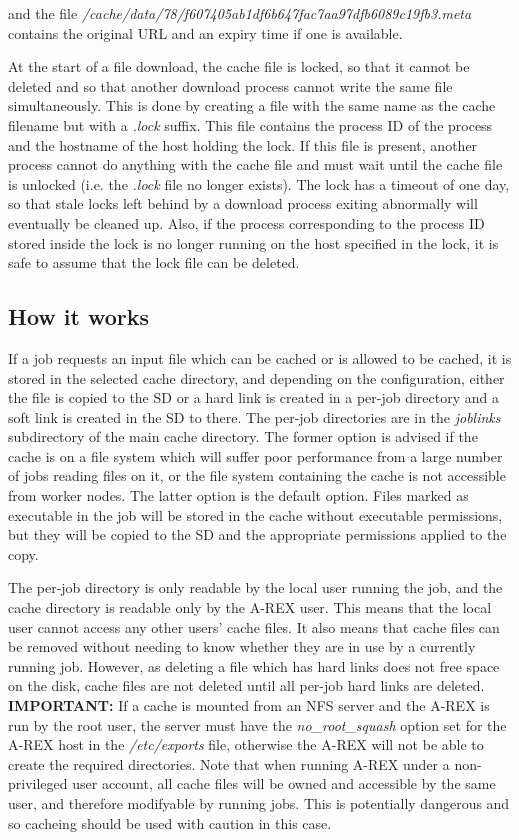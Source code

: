 \documentclass{article}                            %
\begin{document}
and the file \emph{/cache/data/78/f607405ab1df6b647fac7aa97dfb6089c19fb3.meta
}contains the original URL and an expiry time if one is available.

At the start of a file download, the cache file is locked, so that
it cannot be deleted and so that another download process cannot write
the same file simultaneously. This is done by creating a file with the
same name as the cache filename but with a \emph{.lock} suffix. This
file contains the process ID of the process and the hostname of the
host holding the lock. If this file is present, another process cannot
do anything with the cache file and must wait until the cache file
is unlocked (i.e. the \emph{.lock} file no longer exists). The lock
has a timeout of one day, so that stale locks left behind by a download
process exiting abnormally will eventually be cleaned up. Also, if
the process corresponding to the process ID stored inside the lock
is no longer running on the host specified in the lock, it is safe
to assume that the lock file can be deleted.


\subsection{How it works}

If a job requests an input file which can be cached or is allowed to
be cached, it is stored in the selected cache directory, and depending
on the configuration, either the file is copied to the SD or a hard
link is created in a per-job directory and a soft link is created in
the SD to there. The per-job directories are in the \emph{joblinks}
subdirectory of the main cache directory. The former option is advised
if the cache is on a file system which will suffer poor performance
from a large number of jobs reading files on it, or the file system
containing the cache is not accessible from worker nodes. The latter
option is the default option.  Files marked as executable in the job
will be stored in the cache without executable permissions, but they
will be copied to the SD and the appropriate permissions applied to
the copy.

The per-job directory is only readable by the local user running the
job, and the cache directory is readable only by the A-REX user. This
means that the local user cannot access any other users' cache
files. It also means that cache files can be removed without needing
to know whether they are in use by a currently running job. However,
as deleting a file which has hard links does not free space on the
disk, cache files are not deleted until all per-job hard links are
deleted. \textbf{IMPORTANT:} If a cache is mounted from an NFS server
and the A-REX is run by the root user, the server must have the
\emph{no\_root\_squash} option set for the A-REX host in the
\emph{/etc/exports} file, otherwise the A-REX will not be able to
create the required directories. Note that when running A-REX under a
non-privileged user account, all cache files will be owned and
accessible by the same user, and therefore modifyable by running
jobs. This is potentially dangerous and so cacheing should be used
with caution in this case.
\end{document}
